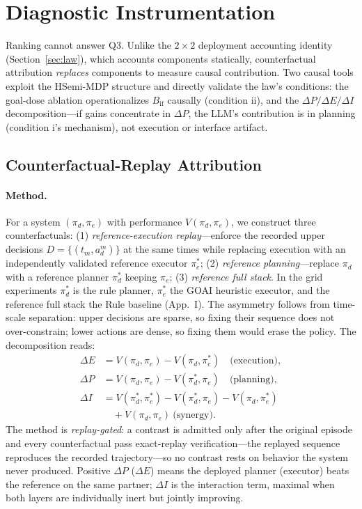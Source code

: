 \documentclass[sigconf,anonymous]{aamas}
\newcommand{\sapp}[1]{App.~#1}
\newcommand{\Bif}{B_{\mathrm{if}}}
\begin{document}
\section{Diagnostic Instrumentation}\label{sec:diag}

Ranking cannot answer Q3. Unlike the $2\times2$ deployment accounting identity (Section~\ref{sec:law}), which accounts components statically, counterfactual attribution \emph{replaces} components to measure causal contribution. Two causal tools exploit the HSemi-MDP structure and directly validate the law's conditions: the goal-dose ablation operationalizes $\Bif$ causally (condition ii), and the $\Delta P/\Delta E/\Delta I$ decomposition---if gains concentrate in $\Delta P$, the LLM's contribution is in planning (condition i's mechanism), not execution or interface artifact.

\subsection{Counterfactual-Replay Attribution}\label{sec:attribution}

\paragraph{Method.}
For a system $(\pi_d, \pi_e)$ with performance $V(\pi_d, \pi_e)$, we construct three counterfactuals: (1) \emph{reference-execution replay}---enforce the recorded upper decisions $D = \{(t_m, a_d^m)\}$ at the same times while replacing execution with an independently validated reference executor $\pi_e^*$; (2) \emph{reference planning}---replace $\pi_d$ with a reference planner $\pi_d^*$ keeping $\pi_e$; (3) \emph{reference full stack}. In the grid experiments $\pi_d^*$ is the rule planner, $\pi_e^*$ the GOAI heuristic executor, and the reference full stack the Rule baseline (\sapp{I}). The asymmetry follows from time-scale separation: upper decisions are sparse, so fixing their sequence does not over-constrain; lower actions are dense, so fixing them would erase the policy. The decomposition reads:
\begin{align}
\Delta E &= V(\pi_d,\pi_e) - V(\pi_d,\pi_e^*) \quad \text{(execution)},\label{eq:de}\\
\Delta P &= V(\pi_d,\pi_e) - V(\pi_d^*,\pi_e) \quad \text{(planning)},\label{eq:dp}\\
\Delta I &= V(\pi_d^*,\pi_e^*) - V(\pi_d^*,\pi_e) - V(\pi_d,\pi_e^*) \nonumber\\
&\quad + V(\pi_d,\pi_e) \ \text{(synergy)}.\label{eq:di}
\end{align}
The method is \emph{replay-gated}: a contrast is admitted only after the original episode and every counterfactual pass exact-replay verification---the replayed sequence reproduces the recorded trajectory---so no contrast rests on behavior the system never produced. Positive $\Delta P$ ($\Delta E$) means the deployed planner (executor) beats the reference on the same partner; $\Delta I$ is the interaction term, maximal when both layers are individually inert but jointly improving.
\end{document}

